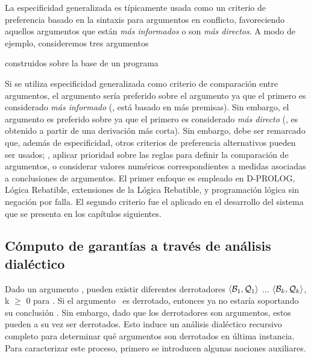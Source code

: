  La especificidad generalizada es típicamente usada como un criterio de
 preferencia basado en la sintaxis  para argumentos en conflicto,
 favoreciendo aquellos argumentos que están \textit{más informados} o
 son  \textit{más directos}. A modo de ejemplo, consideremos tres
 argumentos 


 \noindent
 construidos sobre la base de un programa 


 Si se utiliza especificidad generalizada como criterio de
 comparación entre argumentos, el argumento  
 sería preferido sobre el argumento  ya
 que el primero es considerado \textit{más informado} (\ie, está basado
 en más premisas). Sin embargo, el argumento   es preferido sobre  
 ya que el primero es considerado
 \textit{más directo} (\ie, es obtenido a partir de una derivación más
 corta). Sin embargo, debe ser remarcado que, además de especificidad,
 otros criterios de preferencia alternativos pueden ser usados;  \eg,
 aplicar prioridad sobre las reglas para definir la comparación de
 argumentos, o considerar valores  numéricos correspondientes a medidas
 asociadas a conclusiones de argumentos. El primer enfoque es empleado
 en {\footnotesize D}-P{\footnotesize ROLOG}, Lógica Rebatible,
 extensiones de la Lógica Rebatible, y programación lógica sin negación
 por falla. El segundo criterio fue el aplicado en el desarrollo del
 sistema que se presenta en los capítulos siguientes.

\subsection{Cómputo de garantías a través de análisis dialéctico}
\label{sub:computo_garantias}
 
 Dado un argumento \AQ, pueden existir diferentes derrotadores $\mbox{$\langle \mbox{${\mathcal B_1}$},\mbox{${\mathcal Q_1}$} \rangle $}$
 $\ldots$ $\mbox{$\langle \mbox{${\mathcal B_k}$},\mbox{${\mathcal Q_k}$} \rangle $}$, k $\ge$ 0 para \AQ. Si el argumento \AQ\ es
 derrotado, entonces ya no estaría soportando su conclusión \ArgQ.  Sin
 embargo, dado que los derrotadores son argumentos, estos pueden a su
 vez ser derrotados. Esto  induce un análisis dialéctico recursivo
 completo para determinar qué argumentos son derrotados en  última
 instancia. Para caracterizar este proceso, primero se introducen
 algunas nociones auxiliares.
 
